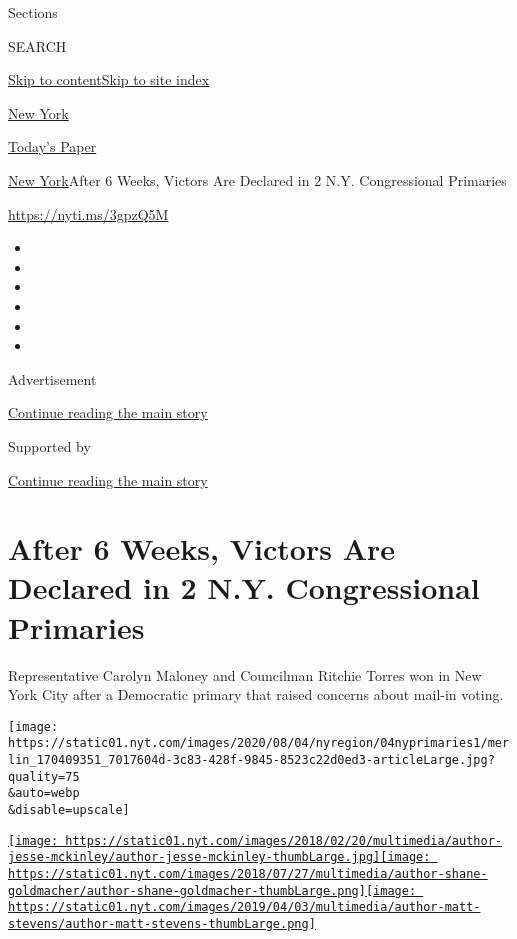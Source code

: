 Sections

SEARCH

\protect\hyperlink{site-content}{Skip to
content}\protect\hyperlink{site-index}{Skip to site index}

\href{https://www.nytimes.com/section/nyregion}{New York}

\href{https://myaccount.nytimes.com/auth/login?response_type=cookie\&client_id=vi}{}

\href{https://www.nytimes.com/section/todayspaper}{Today's Paper}

\href{/section/nyregion}{New York}\textbar{}After 6 Weeks, Victors Are
Declared in 2 N.Y. Congressional Primaries

\href{https://nyti.ms/3gpzQ5M}{https://nyti.ms/3gpzQ5M}

\begin{itemize}
\item
\item
\item
\item
\item
\item
\end{itemize}

Advertisement

\protect\hyperlink{after-top}{Continue reading the main story}

Supported by

\protect\hyperlink{after-sponsor}{Continue reading the main story}

\hypertarget{after-6-weeks-victors-are-declared-in-2-ny-congressional-primaries}{%
\section{After 6 Weeks, Victors Are Declared in 2 N.Y. Congressional
Primaries}\label{after-6-weeks-victors-are-declared-in-2-ny-congressional-primaries}}

Representative Carolyn Maloney and Councilman Ritchie Torres won in New
York City after a Democratic primary that raised concerns about mail-in
voting.

\texttt{[image: https://static01.nyt.com/images/2020/08/04/nyregion/04nyprimaries1/merlin\_170409351\_7017604d-3c83-428f-9845-8523c22d0ed3-articleLarge.jpg?quality=75\\\&auto=webp\\\&disable=upscale]}

\href{https://www.nytimes.com/by/jesse-mckinley}{\texttt{[image: https://static01.nyt.com/images/2018/02/20/multimedia/author-jesse-mckinley/author-jesse-mckinley-thumbLarge.jpg]}}\href{https://www.nytimes.com/by/shane-goldmacher}{\texttt{[image: https://static01.nyt.com/images/2018/07/27/multimedia/author-shane-goldmacher/author-shane-goldmacher-thumbLarge.png]}}\href{https://www.nytimes.com/by/matt-stevens}{\texttt{[image: https://static01.nyt.com/images/2019/04/03/multimedia/author-matt-stevens/author-matt-stevens-thumbLarge.png]}}

